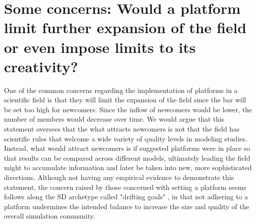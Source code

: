 \documentclass[11pt]{article}
\begin{document}
\section {Some concerns:  Would a platform limit further expansion of the field or even impose limits to its creativity?}
One of the common concerns regarding the implementation of platforms in a scientific field is that they will limit the expansion of the field since the bar will be set too high for newcomers.  Since the inflow of newcomers would be lower, the number of members would decrease over time.  We would argue that this statement oversees that the what attracts newcomers is not that the field has scientific rules that welcome a wide variety of quality levels in modeling studies.  Instead, what would attract newcomers is if suggested platforms were in place so that results can be compared across different models, ultimately leading the field might to accumulate information and later be taken into new, more sophisticated directions.  Although not having any empirical evidence to demonstrate this statement, the concern raised by those concerned with setting a platform seems follows along the SD archetype called "drifting goals" \cite{systems-thinking}, in that not adhering to a platform undermines the intended balance to increase the size and quality of the overall simulation community.
\end{document}
